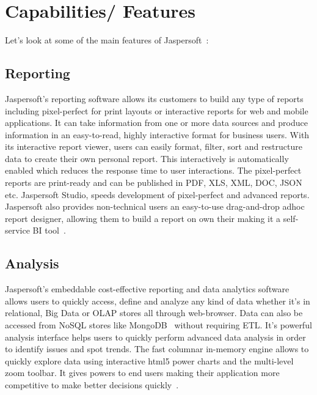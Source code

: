 \section{Capabilities/ Features}
Let's look at some of the main features of
Jaspersoft~\cite{hid-sp18-516-www-jaspersoft-features}:

\subsection{Reporting}
Jaspersoft's reporting software allows its customers to build any type of
reports including pixel-perfect for print layouts or interactive reports for web
and mobile applications. It can take information from one or more data sources
and produce information in an easy-to-read, highly interactive format for
business users. With its interactive report viewer, users can easily format,
filter, sort and restructure data to create their own personal report. This
interactively is automatically enabled which reduces the response time to user
interactions. The pixel-perfect reports are print-ready and can be published in
PDF, XLS, XML, DOC, JSON etc. Jaspersoft Studio, speeds development of
pixel-perfect and advanced reports. Jaspersoft also provides non-technical users
an easy-to-use drag-and-drop adhoc report designer, allowing them to build a
report on own their making it a self-service BI
tool~\cite{hid-sp18-516-www-jaspersoft-reporting-software}. 

\subsection{Analysis}
Jaspersoft's embeddable cost-effective reporting and data analytics software
allows users to quickly access, define and analyze any kind of data whether it's
in relational, Big Data or OLAP stores all through web-browser. Data can also be
accessed from NoSQL stores like MongoDB~\cite{hid-sp18-516-www-wiki-mongodb}
without requiring ETL. It's powerful analysis interface helps users to quickly
perform advanced data analysis in order to identify issues and spot trends. The
fast columnar in-memory engine allows to quickly explore data using interactive
html5 power charts and the multi-level zoom toolbar. It gives powers to end
users making their application more competitive to make better decisions
quickly~\cite{hid-sp18-516-www-jaspersoft-analytics-software}.

